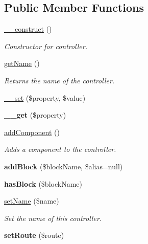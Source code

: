 \subsection*{Public Member Functions}
\begin{DoxyCompactItemize}
\item 
\hypertarget{class_controller_acd649140a4353af09a3a181ae5b00d2e}{
\hyperlink{class_controller_acd649140a4353af09a3a181ae5b00d2e}{\_\-\_\-construct} ()}
\label{class_controller_acd649140a4353af09a3a181ae5b00d2e}

\begin{DoxyCompactList}\small\item\em Constructor for controller. \item\end{DoxyCompactList}\item 
\hyperlink{class_controller_a6e87320e6aa6d9ad34d4c2fb8ee004a1}{getName} ()
\begin{DoxyCompactList}\small\item\em Returns the name of the controller. \item\end{DoxyCompactList}\item 
\hyperlink{class_controller_adfe2035a8eec9a9478c442957b84d533}{\_\-\_\-set} (\$property, \$value)
\item 
\hypertarget{class_controller_aaff54cc92626ec4ecf4673f20d7f5c68}{
{\bfseries \_\-\_\-get} (\$property)}
\label{class_controller_aaff54cc92626ec4ecf4673f20d7f5c68}

\item 
\hyperlink{class_controller_af5f1793d5ac524b867f84e004940d6e6}{addComponent} ()
\begin{DoxyCompactList}\small\item\em Adds a component to the controller. \item\end{DoxyCompactList}\item 
\hypertarget{class_controller_a2a94518457a9c47d48b3f8ae0ac5524a}{
{\bfseries addBlock} (\$blockName, \$alias=null)}
\label{class_controller_a2a94518457a9c47d48b3f8ae0ac5524a}

\item 
\hypertarget{class_controller_a558db4d00bb1e82aa406f49f16cafbd9}{
{\bfseries hasBlock} (\$blockName)}
\label{class_controller_a558db4d00bb1e82aa406f49f16cafbd9}

\item 
\hyperlink{class_controller_a613d097760ed6eb56c658ccff5f04b97}{setName} (\$name)
\begin{DoxyCompactList}\small\item\em Set the name of this controller. \item\end{DoxyCompactList}\item 
\hypertarget{class_controller_a51156de8c43545c5d748686d89d32c4f}{
{\bfseries setRoute} (\$route)}
\label{class_controller_a51156de8c43545c5d748686d89d32c4f}


\end{DoxyCompactItemize}
